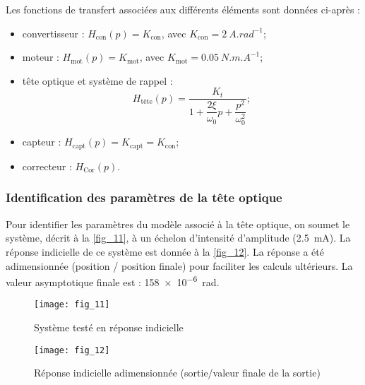 Les fonctions de transfert associées aux différents éléments sont données ci-après :
\begin{multicols}{2}
\begin{itemize}
\item convertisseur : $H_{\text{con}}(p)=K_{\text{con}}$, avec $K_{\text{con}}=\SI{2}{A.rad^{-1}}$;
\item moteur : $H_{\text{mot}}(p)=K_{\text{mot}}$, avec $K_{\text{mot}}=\SI{0,05}{N.m.A^{-1}}$;
\item tête optique et système de rappel : $$H_{\text{tête}}(p)=\dfrac{K_t}{1+\dfrac{2\xi}{\omega_0}p+\dfrac{p^2}{\omega_0^2}};$$
\item capteur : $H_{\text{capt}}(p)=K_{\text{capt}}=K_{\text{con}}$;
\item correcteur : $H_{\text{Cor}}(p)$.
\end{itemize}
\end{multicols}

\subsubsection{Identification des paramètres de la tête optique}
Pour identifier les paramètres du modèle associé à la tête optique, on soumet le système, décrit à la \autoref{fig_11}, à un échelon d’intensité d’amplitude (\SI{2,5}{mA}). La
réponse indicielle de ce système est donnée à la \autoref{fig_12}. La réponse a été adimensionnée (position / position
finale) pour faciliter les calculs ultérieurs. La valeur asymptotique finale est : \SI{158e-6}{rad}.


\begin{figure}[H]
\centering
\texttt{[image: fig\_11]}
\caption{\label{fig_11} Système testé en réponse indicielle}
\end{figure}


\begin{figure}[H]
\centering
\texttt{[image: fig\_12]}
\caption{\label{fig_12} Réponse indicielle adimensionnée (sortie/valeur finale de la sortie)}
\end{figure}

